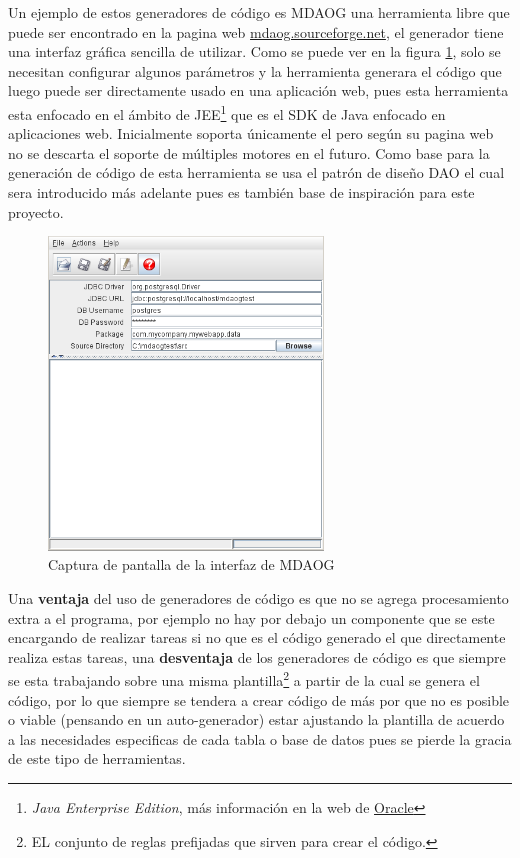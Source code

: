 Un ejemplo de estos generadores de código es MDAOG una herramienta libre que puede ser encontrado en la pagina web \href{http://mdaog.sourceforge.net/}{mdaog.sourceforge.net}, el generador tiene una interfaz gráfica sencilla de utilizar. Como se puede ver en la figura \ref{fig:mdaog}, solo se necesitan configurar algunos parámetros y la herramienta generara el código que luego puede ser directamente usado en una aplicación web, pues esta herramienta esta enfocado en el ámbito de JEE\footnote{\textit{Java Enterprise Edition}, más información en la web de \href{http://www.oracle.com/us/technologies/java/enterprise-edition/overview/index.html}{Oracle}} que es el SDK de Java enfocado en aplicaciones web. Inicialmente soporta únicamente el \dd \p pero según su pagina web no se descarta el soporte de múltiples motores en el futuro. Como base para la generación de código de esta herramienta se usa el patrón de diseño DAO el cual sera introducido más adelante pues es también base de inspiración para este proyecto.  
%
\begin{figure}
  \centering
    \includegraphics[width=0.65\textwidth]{figuras/mdaogMetal.png}
  \caption{Captura de pantalla de la interfaz de MDAOG}
  \label{fig:mdaog}
\end{figure}

Una \textbf{ventaja} del uso de generadores de código es que no se agrega procesamiento extra a el programa, por ejemplo no hay por debajo un componente que se este encargando de realizar tareas si no que es el código generado el que directamente realiza estas tareas, una \textbf{desventaja} de los generadores de código es que siempre se esta trabajando sobre una misma plantilla\footnote{EL conjunto de reglas prefijadas que sirven para crear el código.} a partir de la cual se genera el código, por lo que siempre se tendera a crear código de más por que no es posible o viable (pensando en un auto-generador) estar ajustando la plantilla de acuerdo a las necesidades especificas de cada tabla o base de datos pues se pierde la gracia de este tipo de herramientas.
%

